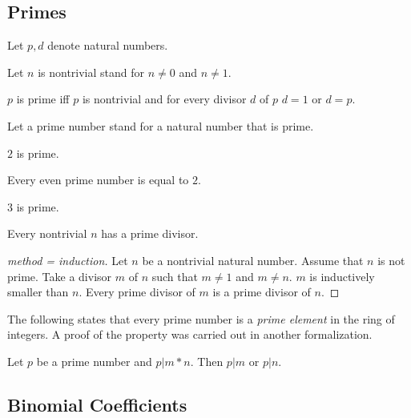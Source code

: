 \documentclass[english,11pt]{article}
\begin{document}
\subsection{Primes}

\begin{forthel}

Let $p,d$ denote natural numbers.

Let $n$ is nontrivial stand for $n \neq 0$ and $n \neq 1$.

\begin{definition}
$p$ is prime iff $p$ is nontrivial and
for every divisor $d$ of $p$ $d = 1$ or $d = p$.
\end{definition}
Let a prime number stand for a natural number that is prime.

\begin{lemma} $2$ is prime.
\end{lemma}

\begin{lemma}
Every even prime number is equal to $2$.
\end{lemma}

\begin{lemma} $3$ is prime.
\end{lemma}

\begin{lemma}
Every nontrivial $n$ has a prime divisor.
\end{lemma}
\begin{proof}[method = induction]
Let $n$ be a nontrivial natural number.
Assume that $n$ is not prime.
Take a divisor $m$ of $n$ such that $m \neq 1$ and $m \neq n$.
$m$ is inductively smaller than $n$.
Every prime divisor of $m$ is a prime divisor of $n$.
\end{proof}

\end{forthel}

The following states that every prime number is a 
\textit{prime element} in the ring of integers. A proof of
the property was carried out in another \Naproche
formalization.

\begin{forthel}
\begin{axiom}[title = Euclids Lemma]
Let $p$ be a prime number and $p | m * n$.
Then $p | m$ or $p | n$. 
\end{axiom}

\end{forthel}


\subsection{Binomial Coefficients}
\end{document}
